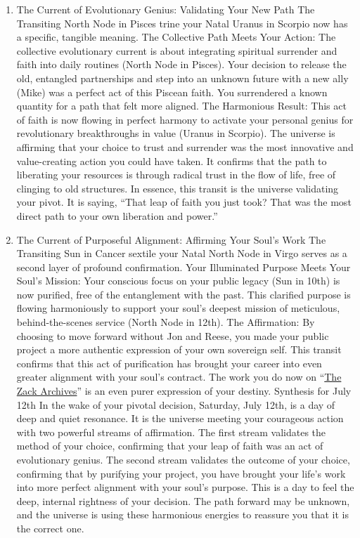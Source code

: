 \documentclass{article}
\begin{document}
\begin{enumerate}
\item
  The Current of Evolutionary Genius: Validating Your New Path The Transiting North Node in Pisces trine your Natal Uranus in Scorpio now has a specific, tangible meaning. The Collective Path Meets Your Action: The collective evolutionary current is about integrating spiritual surrender and faith into daily routines (North Node in Pisces). Your decision to release the old, entangled partnerships and step into an unknown future with a new ally (Mike) was a perfect act of this Piscean faith. You surrendered a known quantity for a path that felt more aligned. The Harmonious Result: This act of faith is now flowing in perfect harmony to activate your personal genius for revolutionary breakthroughs in value (Uranus in Scorpio). The universe is affirming that your choice to trust and surrender was the most innovative and value-creating action you could have taken. It confirms that the path to liberating your resources is through radical trust in the flow of life, free of clinging to old structures. In essence, this transit is the universe validating your pivot. It is saying, ``That leap of faith you just took? That was the most direct path to your own liberation and power.''
\item
  The Current of Purposeful Alignment: Affirming Your Soul's Work The Transiting Sun in Cancer sextile your Natal North Node in Virgo serves as a second layer of profound confirmation. Your Illuminated Purpose Meets Your Soul's Mission: Your conscious focus on your public legacy (Sun in 10th) is now purified, free of the entanglement with the past. This clarified purpose is flowing harmoniously to support your soul's deepest mission of meticulous, behind-the-scenes service (North Node in 12th). The Affirmation: By choosing to move forward without Jon and Reese, you made your public project a more authentic expression of your own sovereign self. This transit confirms that this act of purification has brought your career into even greater alignment with your soul's contract. The work you do now on ``\hyperlink{gloss:the_zack_archives}{The Zack Archives}'' is an even purer expression of your destiny. Synthesis for July 12th In the wake of your pivotal decision, Saturday, July 12th, is a day of deep and quiet resonance. It is the universe meeting your courageous action with two powerful streams of affirmation. The first stream validates the method of your choice, confirming that your leap of faith was an act of evolutionary genius. The second stream validates the outcome of your choice, confirming that by purifying your project, you have brought your life's work into more perfect alignment with your soul's purpose. This is a day to feel the deep, internal rightness of your decision. The path forward may be unknown, and the universe is using these harmonious energies to reassure you that it is the correct one.
\end{enumerate}
\end{document}
